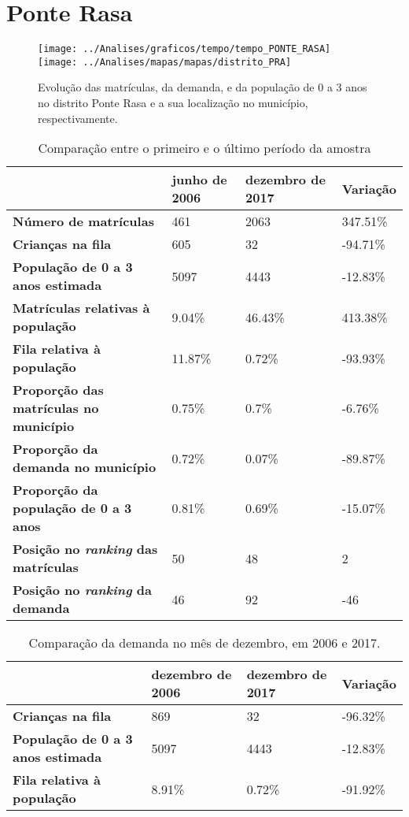 \section{Ponte Rasa}
\begin{figure}[H]
	\centering
	\texttt{[image: ../Analises/graficos/tempo/tempo\_PONTE\_RASA]}
	\texttt{[image: ../Analises/mapas/mapas/distrito\_PRA]}
	\caption{Evolução das matrículas, da demanda, e da população de 0 a 3 anos no distrito Ponte Rasa e a sua localização no município, respectivamente.}
\end{figure}
\begin{table}[H]
	\begin{tabular}{|l|l|l|l|}
		\hline
		\textbf{}                                      & \textbf{junho de 2006}       & \textbf{dezembro de 2017}    & \textbf{Variação} \\ \hline
		\textbf{Número de matrículas}                  & 461 & 2063 & 347.51\% \\ \hline
		\textbf{Crianças na fila}                      & 605 & 32 & -94.71\% \\ \hline
		\textbf{População de 0 a 3 anos estimada}      & 5097 & 4443 & -12.83\% \\ \hline
		\textbf{Matrículas relativas à população}      & 9.04\% & 46.43\% & 413.38\% \\ \hline
		\textbf{Fila relativa à população}             & 11.87\% & 0.72\% & -93.93\% \\ \hline
		\textbf{Proporção das matrículas no município} & 0.75\% & 0.7\% & -6.76\% \\ \hline
		\textbf{Proporção da demanda no município}     & 0.72\% & 0.07\% & -89.87\% \\ \hline
		\textbf{Proporção da população de 0 a 3 anos}  & 0.81\% & 0.69\% & -15.07\% \\ \hline
		\textbf{Posição no \textit{ranking} das matrículas}     & 50 & 48 & 2 \\ \hline
		\textbf{Posição no \textit{ranking} da demanda}         & 46 & 92 & -46 \\ \hline
	\end{tabular}
	\caption{Comparação entre o primeiro e o último período da amostra}
\end{table}
\begin{table}[H]
	\begin{tabular}{|l|l|l|l|}
		\hline
		\textbf{}                                 & \textbf{dezembro de 2006} & \textbf{dezembro de 2017} & \textbf{Variação} \\ \hline
		\textbf{Crianças na fila}                      & 869 & 32 & -96.32\% \\ \hline
		\textbf{População de 0 a 3 anos estimada}      & 5097 & 4443 & -12.83\% \\ \hline
		\textbf{Fila relativa à população}             & 8.91\% & 0.72\% & -91.92\% \\ \hline
	\end{tabular}
	\caption{Comparação da demanda no mês de dezembro, em 2006 e 2017.}
\end{table}
